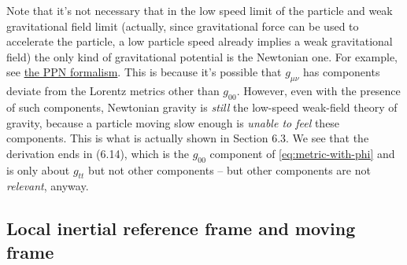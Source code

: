 \documentclass[hyperref, a4paper]{article}
\begin{document}
Note that it's not necessary that in the low speed limit of the particle and weak gravitational field limit
(actually, since gravitational force can be used to accelerate the particle, a low particle speed already 
implies a weak gravitational field) the only kind of gravitational potential is the Newtonian one.
For example, see \href{https://en.wikipedia.org/wiki/Parameterized\_post-Newtonian\_formalism}{the PPN formalism}.
This is because it's possible that $g_{\mu \nu}$ has components deviate from the Lorentz metrics other 
than $g_{00}$. However, even with the presence of such components, Newtonian gravity is \emph{still} 
the low-speed weak-field theory of gravity, because a particle moving slow enough is \emph{unable to feel} 
these components. This is what is actually shown in Section 6.3. 
We see that the derivation ends in (6.14), which is the $g_{00}$ component of \eqref{eq:metric-with-phi} 
and is only about $g_{tt}$ but not other components -- but other components are not \emph{relevant}, anyway.

\subsection{Local inertial reference frame and moving frame}
\end{document}
